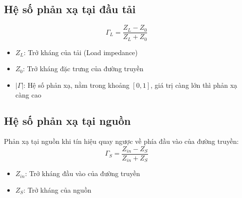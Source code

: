         \subsection{Hệ số phản xạ tại đầu tải}
            $$\Gamma_L = \frac{Z_{L} - Z_0}{Z_{L} + Z_0}$$
            \begin{itemize}
                \item $Z_{L}$: Trở kháng của tải (Load impedance)
                \item $Z_0$: Trở kháng đặc trưng của đường truyền
                \item $|\Gamma|$: Hệ số phản xạ, nằm trong khoảng $\left[0,1\right]$, giá trị càng lớn thì phản xạ càng cao
            \end{itemize}
        
        \subsection{Hệ số phản xạ tại nguồn}
            Phản xạ tại nguồn khi tín hiệu quay ngược về phía đầu vào của đường truyền:
            $$\Gamma_S = \frac{Z_{in} - Z_S}{Z_{in} + Z_S}$$
            \begin{itemize}
                \item $Z_{in}$: Trở kháng đầu vào của đường truyền
                \item $Z_S$: Trở kháng của nguồn
            \end{itemize}

